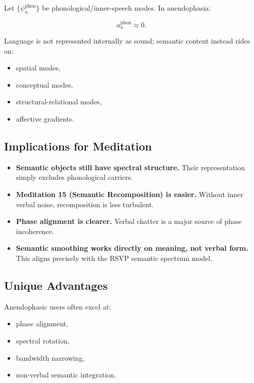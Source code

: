\documentclass[12pt]{article}
\begin{document}
Let $\{\psi_n^{\text{phon}}\}$ be phonological/inner-speech modes.
In anendophasia:

\[
a_n^{\text{phon}} \approx 0.
\]

Language is not represented internally as sound;
semantic content instead rides on:

\begin{itemize}
\item spatial modes,
\item conceptual modes,
\item structural-relational modes,
\item affective gradients.
\end{itemize}


\subsection{Implications for Meditation}

\begin{itemize}
    \item \textbf{Semantic objects still have spectral structure.}  
          Their representation simply excludes phonological carriers.

    \item \textbf{Meditation 15 (Semantic Recomposition) is easier.}  
          Without inner verbal noise, recomposition is less turbulent.

    \item \textbf{Phase alignment is clearer.}  
          Verbal chatter is a major source of phase incoherence.

    \item \textbf{Semantic smoothing works directly on meaning, not verbal form.}  
          This aligns precisely with the RSVP semantic spectrum model.
\end{itemize}

\subsection{Unique Advantages}

Anendophasic users often excel at:

\begin{itemize}
\item phase alignment,
\item spectral rotation,
\item bandwidth narrowing,
\item non-verbal semantic integration.
\end{itemize}
\end{document}
